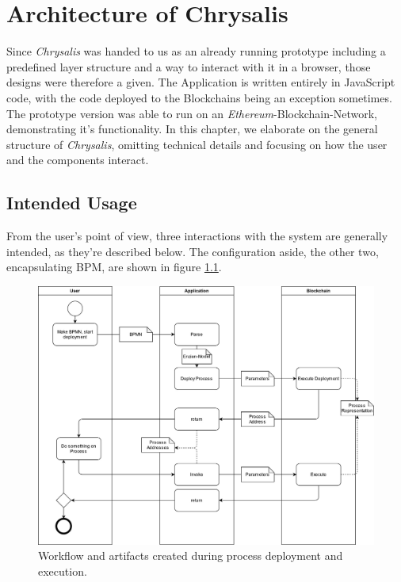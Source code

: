 %
\chapter{Architecture of Chrysalis}
\label{sec:init}

Since \emph{Chrysalis} was handed to us as an already running prototype including a predefined layer structure and a way to interact with it in a browser, those designs were therefore a given. The Application is written entirely in JavaScript code, with the code deployed to the Blockchains being an exception sometimes.
The prototype version was able to run on an \emph{Ethereum}-Blockchain-Network, demonstrating it's functionality.
In this chapter, we elaborate on the general structure of \emph{Chrysalis}, omitting technical details and focusing on how the user and the components interact.

\section{Intended Usage}
\label{sec:init:usage}

From the user's point of view, three interactions with the system are generally intended, as they're described below. The configuration aside, the other two, encapsulating BPM, are shown in figure \ref{fig:init:usage:bpm}.

\begin{figure}[h]
	\centering
	\captionsetup{justification=centering,margin=2cm}
	\includegraphics[height=0.7\textwidth]{gfx/bpmn2bc}
	\caption{Workflow and artifacts created during process deployment and execution.}
	\label{fig:init:usage:bpm}
\end{figure}

